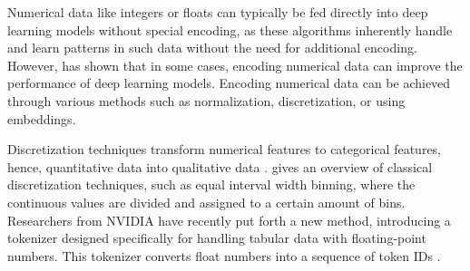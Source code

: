 Numerical data like integers or floats can typically be fed directly into deep learning models without special encoding, as these algorithms inherently handle and learn patterns in such data without the need for additional encoding.
However, \textcite{gorishniy2022EmbeddingsNumericalFeatures} has shown that in some cases, encoding numerical data can improve the performance of deep learning models. 
Encoding numerical data can be achieved through various methods such as normalization, discretization, or using embeddings.

Discretization techniques transform numerical features to categorical features, hence, quantitative data into qualitative data \cite{garcia2016BigDataPreprocessing}. 
\textcite{dougherty1995SupervisedUnsupervisedDiscretization} gives an overview of classical discretization techniques, such as equal interval width binning, where the continuous values are divided and assigned to a certain amount of bins.
Researchers from NVIDIA \cite{dong2022GeneratingSyntheticData} have recently put forth a new method, introducing a tokenizer designed specifically for handling tabular data with floating-point numbers.
This tokenizer converts float numbers into a sequence of token IDs \cite{dong2022GeneratingSyntheticData}.

